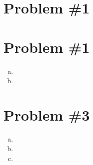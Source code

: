 \documentclass[11pt]{article}
\numberwithin{equation}{section}
\begin{document}


\section{Problem \#1}

\pagebreak

\section{Problem \#1}
\begin{enumerate}[(a)]
\item
\item
\end{enumerate}

\pagebreak

\section{Problem \#3}
\begin{enumerate}[(a)]
\item
\item
\item
\end{enumerate}
\end{document}

